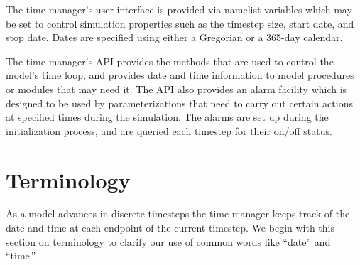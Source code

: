 \documentclass[12pt]{article}
\begin{document}
The time manager's user interface is provided via namelist variables
which may be set to control simulation properties such as the timestep
size, start date, and stop date.  Dates are specified using either a
Gregorian or a 365-day calendar.

The time manager's API provides the methods that are used to control the
model's time loop, and provides date and time information to model
procedures or modules that may need it.  The API also provides an alarm
facility which is designed to be used by parameterizations that need to
carry out certain actions at specified times during the simulation.  The
alarms are set up during the initialization process, and are queried each
timestep for their on/off status.

\section{Terminology}

As a model advances in discrete timesteps the time manager keeps track of
the date and time at each endpoint of the current timestep.  We begin with
this section on terminology to clarify our use of common words like
``date'' and ``time.''
\end{document}
